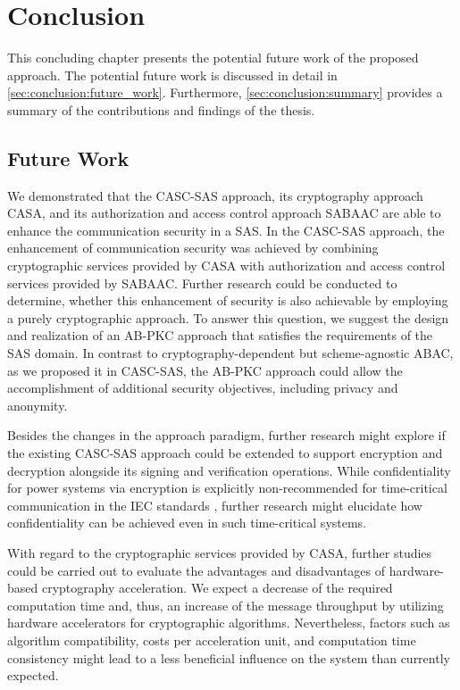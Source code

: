 \chapter{Conclusion}
\label{ch:conclusion}
This concluding chapter presents the potential future work of the proposed approach.
The potential future work is discussed in detail in \autoref{sec:conclusion:future_work}.
Furthermore, \autoref{sec:conclusion:summary} provides a summary of the contributions and findings of the thesis.

\section{Future Work}
\label{sec:conclusion:future_work}
We demonstrated that the CASC-SAS approach, its cryptography approach CASA, and its authorization and access control approach SABAAC are able to enhance the communication security in a SAS.
In the CASC-SAS approach, the enhancement of communication security was achieved by combining cryptographic services provided by CASA with authorization and access control services provided by SABAAC.
Further research could be conducted to determine, whether this enhancement of security is also achievable by employing a purely cryptographic approach.
To answer this question, we suggest the design and realization of an AB-PKC approach that satisfies the requirements of the SAS domain.
In contrast to cryptography-dependent but scheme-agnostic ABAC, as we proposed it in CASC-SAS, the AB-PKC approach could allow the accomplishment of additional security objectives, including privacy and anonymity.

Besides the changes in the approach paradigm, further research might explore if the existing CASC-SAS approach could be extended to support encryption and decryption alongside its signing and verification operations.
While confidentiality for power systems via encryption is explicitly non-recommended for time-critical communication in the IEC standards \cite{IEC62351P6}, further research might elucidate how confidentiality can be achieved even in such time-critical systems.

With regard to the cryptographic services provided by CASA, further studies could be carried out to evaluate the advantages and disadvantages of hardware-based cryptography acceleration.
We expect a decrease of the required computation time and, thus, an increase of the message throughput by utilizing hardware accelerators for cryptographic algorithms.
Nevertheless, factors such as algorithm compatibility, costs per acceleration unit, and computation time consistency might lead to a less beneficial influence on the system than currently expected.

